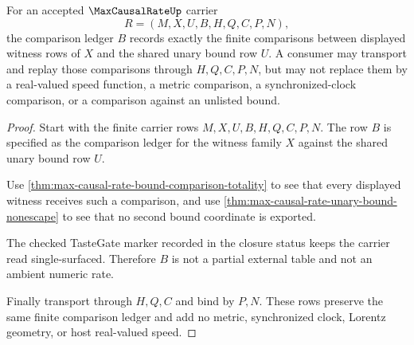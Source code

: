 \begin{theorem}
\label{thm:max-causal-rate-comparison-ledger-exactness}
For an accepted $\MaxCausalRateUp$ carrier
$$
R=(M,X,U,B,H,Q,C,P,N),
$$
the comparison ledger $B$ records exactly the finite comparisons between displayed witness rows of $X$ and the shared unary bound row $U$. A consumer may transport and replay those comparisons through $H,Q,C,P,N$, but may not replace them by a real-valued speed function, a metric comparison, a synchronized-clock comparison, or a comparison against an unlisted bound.
\end{theorem}
\begin{proof}
Start with the finite carrier rows $M,X,U,B,H,Q,C,P,N$. The row $B$ is specified as the comparison ledger for the witness family $X$ against the shared unary bound row $U$.

Use \autoref{thm:max-causal-rate-bound-comparison-totality} to see that every displayed witness receives such a comparison, and use \autoref{thm:max-causal-rate-unary-bound-nonescape} to see that no second bound coordinate is exported.

The checked TasteGate marker recorded in the closure status keeps the carrier read single-surfaced. Therefore $B$ is not a partial external table and not an ambient numeric rate.

Finally transport through $H,Q,C$ and bind by $P,N$. These rows preserve the same finite comparison ledger and add no metric, synchronized clock, Lorentz geometry, or host real-valued speed.
\end{proof}

